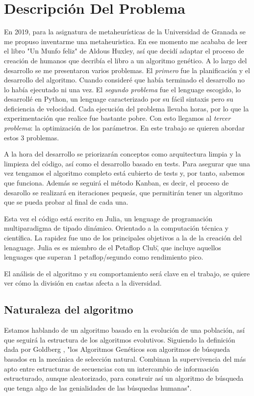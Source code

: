 \chapter{Descripción Del Problema}

En 2019, para la asignatura de metaheurísticas de la Universidad de Granada se me propuso inventarme una metaheuristica. En
ese momento me acababa de leer el libro "Un Munfo feliz" de Aldous Huxley, así que decidí adaptar el proceso de creación 
de humanos que decribía el libro a un algoritmo genético. A lo largo del desarrollo se me presentaron varios problemas. El \textit{primero} fue
la planificación y el desarrollo del algoritmo. Cuando consideré que había terminado el desarrollo no lo había ejecutado ni una vez. El
\textit{segundo problema} fue el lenguage escogido, lo desarrollé en Python, un lenguage caracterizado por su fácil sintaxis pero su deficiencia de
velocidad. Cada ejecución del problema llevaba horas, por lo que la experimentación que realice fue bastante pobre. Con esto llegamos
al \textit{tercer problema}: la optimización de los parámetros. En este trabajo se quieren abordar estos 3 problemas. 

A la hora del desarrollo se priorizarán conceptos como arquitectura limpia \cite{cleanArquitecture2017} y la limpieza del
código, así como el desarrollo basado en tests. Para asegurar que una vez tengamos el algoritmo completo está cubierto de tests y, por tanto, sabemos que funciona. Además
se seguirá el método Kanban, es decir, el proceso de desarollo se realizará en iteraciones pequeás, que permitirán tener un algoritmo que se pueda probar
al final de cada una. 

Esta vez el código está escrito en Julia, un lenguage de programación multiparadigma de tipado dinámico. Orientado a la computación técnica y 
científica. La rapidez fue uno de los principales objetivos a la de la creación del lenaguage. Julia es es miembro de el \"Petaflop Club\", que incluye 
aquellos lenguages que superan 1 petaflop/segundo como rendimiento pico. 

El análisis de el algoritmo y su comportamiento será clave en el trabajo, se quiere ver cómo la división en castas afecta a la diversidad.

\section{Naturaleza del algoritmo}

Estamos hablando de un algoritmo basado en la evolución de una población, así que seguirá la estructura de los
algoritmos evolutivos. Siguiendo la definición dada por Goldberg \cite{goldberg89}, "los Algoritmos Genéticos son algoritmos de búsqueda
basados en la mecánica de selección natural. Combinan la supervivencia del más apto entre estructuras de secuencias con un intercambio de 
información estructurado, aunque aleatorizado, para construir así un algoritmo
de búsqueda que tenga algo de las genialidades de las búsquedas humanas".

